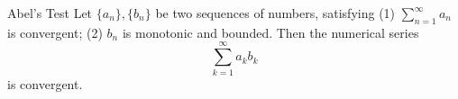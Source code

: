 \begin{theorem}{Abel's Test}{}
  Let $\{a_n\}, \{b_n\}$ be two sequences of numbers,
  satisfying
  (1) $\sum\limits_{n = 1}^{\infty}a_n$ is convergent;
  (2) $b_n$ is monotonic and bounded.
  Then the numerical series
  \begin{equation}
    \sum\limits_{k = 1}^{\infty} a_kb_k
  \end{equation}
  is convergent.
\end{theorem}


